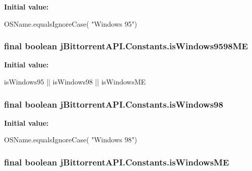 \label{classj_bittorrent_a_p_i_1_1_constants_a1c508f559c9d497f62f1b576d2afcbfa}
{\bfseries Initial value:}
\begin{DoxyCode}
 OSName.equalsIgnoreCase(
            "Windows 95")
\end{DoxyCode}
\hypertarget{classj_bittorrent_a_p_i_1_1_constants_a5722740f14ec03123a64f7e1210316f4}{
\subsubsection[{isWindows9598ME}]{\setlength{\rightskip}{0pt plus 5cm}final boolean jBittorrentAPI.Constants.isWindows9598ME}}
\label{classj_bittorrent_a_p_i_1_1_constants_a5722740f14ec03123a64f7e1210316f4}
{\bfseries Initial value:}
\begin{DoxyCode}
 isWindows95 || isWindows98 ||
                                                  isWindowsME
\end{DoxyCode}
\hypertarget{classj_bittorrent_a_p_i_1_1_constants_a1e1a9a15b3495c7c5470a1f9b41f59f0}{
\subsubsection[{isWindows98}]{\setlength{\rightskip}{0pt plus 5cm}final boolean jBittorrentAPI.Constants.isWindows98}}
\label{classj_bittorrent_a_p_i_1_1_constants_a1e1a9a15b3495c7c5470a1f9b41f59f0}
{\bfseries Initial value:}
\begin{DoxyCode}
 OSName.equalsIgnoreCase(
            "Windows 98")
\end{DoxyCode}
\hypertarget{classj_bittorrent_a_p_i_1_1_constants_a46866fe74f0e1f12733aedca1b21c988}{
\subsubsection[{isWindowsME}]{\setlength{\rightskip}{0pt plus 5cm}final boolean jBittorrentAPI.Constants.isWindowsME}}
